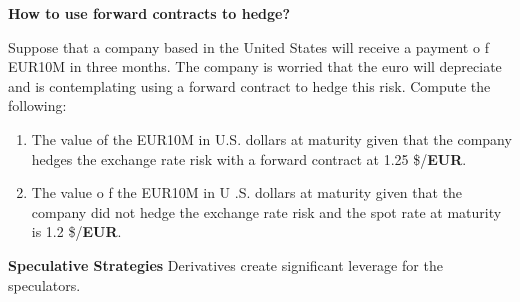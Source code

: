 \documentclass[11pt,fleqn]{book} %
\numberwithin{equation}{section} %
\numberwithin{figure}{section} %
\numberwithin{table}{section} %
\begin{document}
\begin{exercise}\textbf{How to use forward contracts to hedge?}

Suppose that a company based in the United States will receive a payment o f EUR10M in
three months. The company is worried that the euro will depreciate and is contemplating
using a forward contract to hedge this risk. Compute the following:
\begin{enumerate}
    \item The value of the EUR10M in U.S. dollars at maturity given that the company hedges the
exchange rate risk with a forward contract at 1.25 \$/\textbf{EUR}.
    \item The value o f the EUR10M in U .S. dollars at maturity given that the company did not
hedge the exchange rate risk and the spot rate at maturity is 1.2 \$/\textbf{EUR}.
\end{enumerate}
\end{exercise}

\begin{remark}\textbf{Speculative Strategies}
Derivatives create significant leverage for the speculators.
\end{remark}

\end{document}
